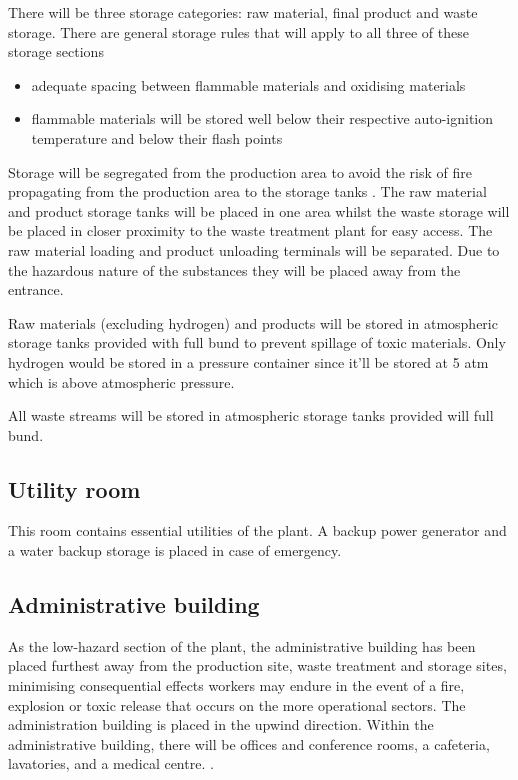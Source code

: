 There will be three storage categories: raw material, final product and waste storage. There are general storage rules that will apply to all three of these storage sections 

\begin{itemize}
    \item adequate spacing between flammable materials and oxidising materials 
    \item flammable materials will be stored well below their respective auto-ignition temperature and below their flash points
\end{itemize}

Storage will be segregated from the production area to avoid the risk of fire propagating from the production area to the storage tanks \cite{mannan_lees_2012}. The raw material and product storage tanks will be placed in one area whilst the waste storage will be placed in closer proximity to the waste treatment plant for easy access. The raw material loading and product unloading terminals will be separated. Due to the hazardous nature of the substances they will be placed away from the entrance. 

Raw materials (excluding hydrogen) and products will be stored in atmospheric storage tanks provided with full bund to prevent spillage of toxic materials. Only hydrogen would be stored in a pressure container since it'll be stored at 5 atm which is above atmospheric pressure.  

All waste streams will be stored in atmospheric storage tanks provided will full bund.


\subsection{Utility room}
This room contains essential utilities of the plant. A backup power generator and a water backup storage is placed in case of emergency. 


\subsection{Administrative building}

As the low-hazard section of the plant, the administrative building has been placed furthest away from the production site, waste treatment and storage sites, minimising  consequential effects workers may endure in the event of a fire, explosion or toxic release that occurs on the more operational sectors. The administration building is placed in the upwind direction. Within the administrative building, there will be offices and conference rooms, a cafeteria, lavatories, and a medical centre. \cite{sinnott_coulson_2005}. 

